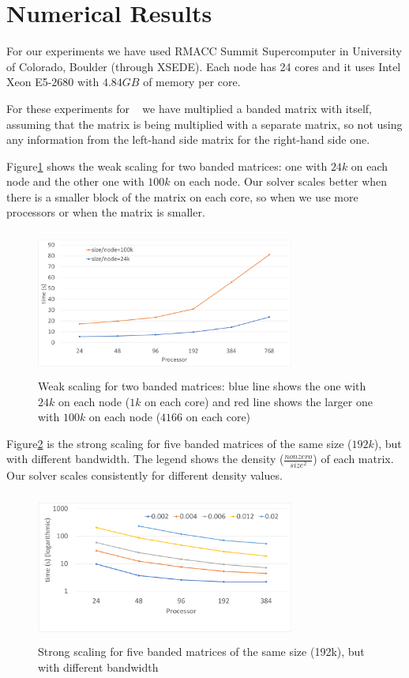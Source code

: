 \section{Numerical Results}
\label{sec:results}

For our experiments we have used RMACC Summit Supercomputer in University of Colorado, Boulder (through XSEDE). Each node has 24 cores and it uses Intel Xeon E5-2680 with $4.84GB$ of memory per core.

For these experiments for \mm~ we have multiplied a banded matrix with itself, assuming that the matrix is being multiplied with a separate matrix, so not using any information from the left-hand side matrix for the right-hand side one.

Figure\ref{fig:weak1} shows the weak scaling for two banded matrices: one with $24k$ on each node and the other one with $100k$ on each node. Our solver scales better when there is a smaller block of the matrix on each core, so when we use more processors or when the matrix is smaller.

\begin{figure}[tbh]
 \centering
 \includegraphics[width=8.5cm,height=4.8cm]{./figures/weak1.pdf}
 \caption{Weak scaling for two banded matrices: blue line shows the one with $24k$ on each node ($1k$ on each core) and red line shows the larger one with $100k$ on each node ($4166$ on each core)}
 \label{fig:weak1}
\end{figure}

Figure\ref{fig:strong1} is the strong scaling for five banded matrices of the same size ($192k$), but with different bandwidth. The legend shows the density ($\frac{nonzero}{size^2}$) of each matrix. Our solver scales consistently for different density values.

\begin{figure}[tbh]
 \centering
 \includegraphics[width=8.5cm,height=4.9cm]{./figures/strong1.pdf}
 \caption{Strong scaling for five banded matrices of the same size (192k), but with different bandwidth}
 \label{fig:strong1}
\end{figure}

